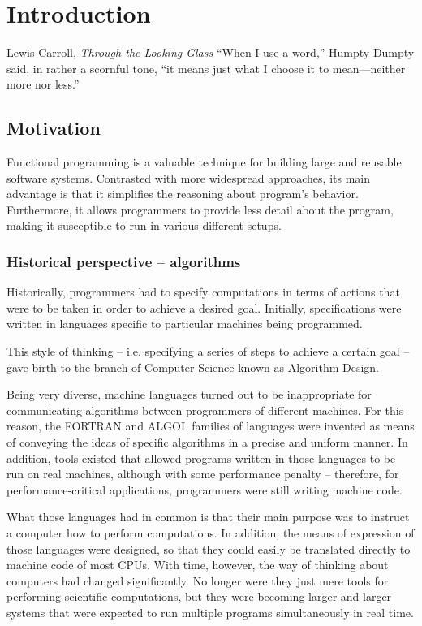 \chapter{Introduction}

\begin{chapquote}{Lewis Carroll, \textit{Through the Looking Glass}}
  “When I use a word,” Humpty Dumpty said, in rather a scornful tone,
  “it means just what I choose it to mean—neither more nor less.”
\end{chapquote}

\section{Motivation}

Functional programming is a valuable technique for building large
and reusable software systems. Contrasted with more widespread
approaches, its main advantage is that it simplifies the reasoning
about program's behavior. Furthermore, it allows programmers to
provide less detail about the program, making it susceptible to run
in various different setups.

\subsection{Historical perspective -- algorithms}

Historically, programmers had to specify computations in terms
of actions that were to be taken in order to achieve a desired goal.
Initially, specifications were written in languages specific to
particular machines being programmed.

This style of thinking -- i.e. specifying a series of steps to
achieve a certain goal -- gave birth to the branch of Computer
Science known as Algorithm Design.

Being very diverse, machine languages turned out to be inappropriate for
communicating algorithms between programmers of different machines.
For this reason, the FORTRAN and ALGOL families of languages were invented
as means of conveying the ideas of specific algorithms in a precise
and uniform manner\cite{Sebesta2008}. In addition, tools existed that allowed
programs written in those languages to be run on real machines, although with
some performance penalty -- therefore, for performance-critical applications,
programmers were still writing machine code\cite{Victor2013}.

What those languages had in common is that their main purpose was
to instruct a computer how to perform computations. In addition,
the means of expression of those languages were designed, so that
they could easily be translated directly to machine code of most CPUs.
With time, however, the way of thinking about computers had changed
significantly. No longer were they just mere tools for performing
scientific computations, but they were becoming larger and larger
systems that were expected to run multiple programs simultaneously
in real time.

